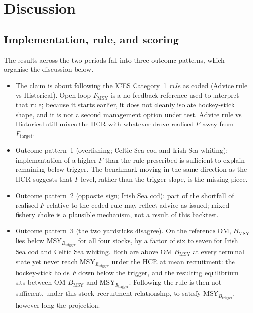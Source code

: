 \documentclass[11pt,a4paper]{article}
\newcommand{\Fmsy}{F_{\mathrm{MSY}}}
\newcommand{\Btrig}{\mathrm{MSY}_{B_{\mathrm{trigger}}}}
\newcommand{\Bmsy}{B_{\mathrm{MSY}}}
\newcommand{\Ftar}{F_{\mathrm{target}}}
\begin{document}
\section{Discussion}
\label{sec:discussion}

\subsection{Implementation, rule, and scoring}
The results across the two periods fall into three outcome patterns,
which organise the discussion below.
\begin{itemize}
  \item The claim is about following the ICES Category~1 \emph{rule} as
        coded (Advice rule vs Historical). Open-loop $\Fmsy$ is a
        no-feedback reference used to interpret that rule; because it
        starts earlier, it does not cleanly isolate hockey-stick shape,
        and it is not a second management option under test. Advice
        rule vs Historical still mixes the HCR with whatever drove
        realised $F$ away from $\Ftar$.
  \item Outcome pattern~1 (overfishing; Celtic Sea cod and Irish Sea
        whiting): implementation of a higher $F$ than the rule
        prescribed is sufficient to explain remaining below trigger. The
        benchmark moving in the same direction as the HCR suggests that
        $F$ level, rather than the trigger slope, is the missing piece.
  \item Outcome pattern~2 (opposite sign; Irish Sea cod): part of the
        shortfall of realised $F$ relative to the coded rule may reflect
        advice as issued; mixed-fishery choke is a plausible mechanism,
        not a result of this backtest.
  \item Outcome pattern~3 (the two yardsticks disagree). On the
        reference OM, $\Bmsy$ lies below $\Btrig$ for all four stocks,
        by a factor of six to seven for Irish Sea cod and Celtic Sea
        whiting. Both are above OM $\Bmsy$ at every terminal state yet
        never reach $\Btrig$ under the HCR at mean recruitment: the
        hockey-stick holds $F$ down below the trigger, and the resulting
        equilibrium sits between OM $\Bmsy$ and $\Btrig$. Following the
        rule is then not sufficient, under this stock--recruitment
        relationship, to satisfy $\Btrig$, however long the projection.

\end{itemize}
\end{document}
